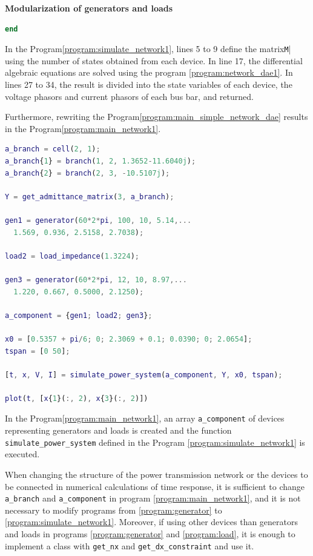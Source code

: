 \documentclass[graybox, envcountchap]{svmult}
\begin{document}
\begin{example}{\textbf{Modularization of generators and loads}}
\begin{lstlisting}[language=Matlab, caption=simulate\_power\_system.m, label={program:simulate_network1}]
end
\end{lstlisting}

In the Program\nobreak\ref{program:simulate_network1}, lines 5 to 9 define the
matrix\verb|M|| using the number of states obtained from each device.  In line
17, the differential algebraic equations are solved using the program
\nobreak\ref{program:network_dae1}. In lines 27 to 34, the result is divided
into the state variables of each device, the voltage phasors and current phasors
of each bus bar, and returned.

Furthermore, rewriting the Program\nobreak\ref{program:main_simple_network_dae}
results in the Program\nobreak\ref{program:main_network1}.

\begin{lstlisting}[language=Matlab, caption=main\_simulation\_3bus.m, label={program:main_network1}]
a_branch = cell(2, 1);
a_branch{1} = branch(1, 2, 1.3652-11.6040j);
a_branch{2} = branch(2, 3, -10.5107j);

Y = get_admittance_matrix(3, a_branch);

gen1 = generator(60*2*pi, 100, 10, 5.14,...
  1.569, 0.936, 2.5158, 2.7038);

load2 = load_impedance(1.3224);

gen3 = generator(60*2*pi, 12, 10, 8.97,...
  1.220, 0.667, 0.5000, 2.1250);

a_component = {gen1; load2; gen3};

x0 = [0.5357 + pi/6; 0; 2.3069 + 0.1; 0.0390; 0; 2.0654];
tspan = [0 50];

[t, x, V, I] = simulate_power_system(a_component, Y, x0, tspan);

plot(t, [x{1}(:, 2), x{3}(:, 2)])
\end{lstlisting}

In the Program\nobreak\ref{program:main_network1}, an array \verb|a_component|
of devices representing generators and loads is created and the function
\verb|simulate_power_system| defined in the Program
\nobreak\ref{program:simulate_network1} is executed.

When changing the structure of the power transmission network or the devices to
be connected in numerical calculations of time response, it is sufficient to
change \verb|a_branch| and \verb|a_component| in program
\ref{program:main_network1}, and it is not necessary to modify programs from
\ref{program:generator} to \ref{program:simulate_network1}. Moreover, if using
other devices than generators and loads in programs \ref{program:generator} and
\ref{program:load}, it is enough to implement a class with \verb|get_nx| and
\verb|get_dx_constraint| and use it.


\end{example}
\end{document}
